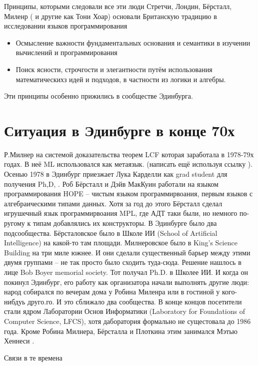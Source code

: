 \documentclass[14pt]{matmex-diploma-custom}
\begin{document}
Принципы, которыми следовали все эти люди
Стретчи, Лондин, Бёрсталл, Миленр ( и другие как Тони Хоар) основали Британскую традицию  в исследовании языков программирования

\begin{itemize}
 \item Осмысление важности фундаментальных основания и семантики в изучении вычислений и программирования
 \item Поиск ясности, строчгости и элегантности путём использования математическихз идей и подходов, в частности из логики и алгебры.
\end{itemize}

Эти принципы особенно прижились в сообществе Эдинбурга.
 
\section{Ситуация в Эдинбурге в конце 70х}
Р.Милнер на системой доказательства теорем LCF которая заработала в 1978-79х годах. В неё ML использовался как метаязык. (написать ещё используя ссылку ). Осенью 1978 в Эдинбург приезжает Лука Карделли как grad student для получения Ph,D, . Роб Бёрсталл и Дэйв МакКуин работали на языком программирования HOPE -- чистым языком программирвоания, первым языков с алгебраическими типами данных.  Хотя за год до этого Бёрсталл сделал игрушечный язык программирвоания MPL, где АДТ таки были, но немного по-ругому к типам добавлялись их конструкторы.  
В Эдинбурге было два подсообщества. Бёрсталовское было в Школе ИИ (School of Artificial Intelligence) на какой-то там площади. Милнеровское было в King’s Science Building на три миле южнее. И они сделали существенный барьер между этими двумя группами -- не так просто было сходить туда-сюда. Решение нашлось в лице Bob Boyer memorial society. Тот получал Ph.D. в Школее ИИ. И когда он покинул Эдинбург, его работу как организатора начали выполнять другие люди: народ собирался по вечерам дома у Робина Миленра  или в гостиной у кого-нибдуь друго.го. И это сближало два   сообщества. В конце концов посетители стали ядром Лаборатории Основ Информатики (Laboratory for Foundations of Computer Science, LFCS), хотя даборатория формально не сущестовала до 1986 года.  Кроме Робина Милнера, Бёрсталла и Плоткина этим занимался Мэтью Хеннеси .

Связи в  те времена 
\end{document}
